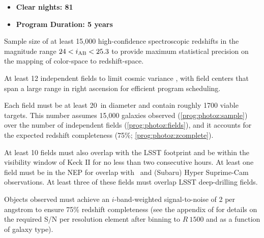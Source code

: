 \documentclass[11pt,a4paper,twoside,onecolumn,openany,final,oldfontcommands]{memoir}
\begin{document}

\medskip
\begin{itemize}[leftmargin=0.3in, itemsep=0pt]
	\item[] \textbf{Clear nights: 81}
	\item[] \textbf{Program Duration: 5 years}
\end{itemize}


\begin{programrequirement}
\reqitem Sample size of at least 15,000 high-confidence spectroscopic redshifts in the magnitude range $24 < i_{\rm AB} < 25.3$ to provide maximum statistical precision on the mapping of color-space to redshift-space. \label{prog:photoz:sample}


\reqitem At least 12 independent fields to limit cosmic variance \citep[see][]{newman15}, with field centers that span a large range in right ascension for efficient program scheduling. \label{prog:photoz:fields}

\reqitem Each field must be at least 20\arcmin\ in diameter and contain roughly 1700 viable targets.  This number assumes 15,000 galaxies observed (\ref{prog:photoz:sample}) over the number of independent fields (\ref{prog:photoz:fields}), and it accounts for the expected redshift completeness (75\%; \ref{prog:photoz:zcomplete}).


\reqitem At least 10 fields must also overlap with the LSST footprint and be within the visibility window of Keck II for no less than two consecutive hours.
\reqitem At least one field must be in the NEP for overlap with \euclid\ and (Subaru) Hyper Suprime-Cam observations.
\reqitem At least three of these fields must overlap LSST deep-drilling fields.

\reqitem Objects observed must achieve an $i$-band-weighted signal-to-noise of 2 per angstrom to ensure 75\% redshift completeness (see the appendix of \citealt{masters15} for details on the required S/N per resolution element after binning to $R~1500$ and as a function of galaxy type).  \label{prog:photoz:snperspec}



\end{programrequirement}
\end{document}

